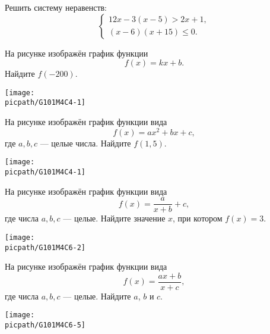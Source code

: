 \begin{exam}
	\begin{listofex}
		\item Решить систему неравенств:
		\[ \left\{
		\begin{array}{l}
			12x-3(x-5)>2x+1,\\
			(x-6)(x+15)\le0.
		\end{array}
		\right. \]
		\item
		\begin{minipage}[t]{\bodywidth}
			На рисунке изображён график функции \[ f(x)=kx+b. \] Найдите \(f(-200)\).
		\end{minipage}
		\hspace{0.02\linewidth}
		\begin{minipage}[t]{\picwidth}
			\texttt{[image: \\picpath/G101M4C4-1]}
		\end{minipage}
		\item
		\begin{minipage}[t]{\bodywidth}
			На рисунке изображён график функции вида \[ f(x)=ax^2+bx+c, \] где  \(a, b, c\) --- целые числа. Найдите \(f(1,5)\).
		\end{minipage}
		\hspace{0.02\linewidth}
		\begin{minipage}[t]{\picwidth}
			\texttt{[image: \\picpath/G101M4C4-1]}
		\end{minipage}
		\item
		\begin{minipage}[t]{\bodywidth}
			На рисунке изображён график функции вида \[ f(x)=\dfrac{a}{x+b}+c, \] где числа \(a, b, c\) --- целые. Найдите значение \(x\), при котором \(f(x)=3\).
		\end{minipage}
		\hspace{0.02\linewidth}
		\begin{minipage}[t]{\picwidth}
			\texttt{[image: \\picpath/G101M4C6-2]}
		\end{minipage}
		\item
		\begin{minipage}[t]{\bodywidth}
			На рисунке изображён график функции вида \[ f(x)=\dfrac{ax+b}{x+c}, \] где числа \(a, b, c\) --- целые. Найдите \( a \), \( b \) и \( c \).
		\end{minipage}
		\hspace{0.02\linewidth}
		\begin{minipage}[t]{\picwidth}
			\texttt{[image: \\picpath/G101M4C6-5]}

\end{minipage}
\end{listofex}
\end{exam}
